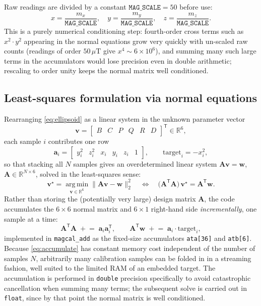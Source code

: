 \documentclass[11pt]{article}
\newcommand{\vect}[1]{\bm{#1}}
\newcommand{\mat}[1]{\bm{#1}}
\newcommand{\R}{\mathbb{R}}
\newcommand{\transpose}{^{\mathsf{T}}}
\begin{document}
Raw readings are divided by a constant $\texttt{MAG\_SCALE}=50$ before use:
\begin{equation}
x = \frac{m_x}{\texttt{MAG\_SCALE}}, \quad y = \frac{m_y}{\texttt{MAG\_SCALE}}, \quad z = \frac{m_z}{\texttt{MAG\_SCALE}}.
\end{equation}
This is a purely numerical conditioning step: fourth-order cross terms such as $x^2\!\cdot\! y^2$ appearing in the normal equations grow very quickly with un-scaled raw counts (readings of order $50\,\mu\mathrm{T}$ give $x^4 \sim 6\times10^6$), and summing many such large terms in the accumulators would lose precision even in double arithmetic; rescaling to order unity keeps the normal matrix well conditioned.

\subsection{Least-squares formulation via normal equations}

Rearranging \eqref{eq:ellipsoid} as a linear system in the unknown parameter vector
\begin{equation}
\vect v = \begin{bmatrix}B & C & P & Q & R & D\end{bmatrix}\transpose \in \R^6,
\end{equation}
each sample $i$ contributes one row
\begin{equation}
\vect a_i = \begin{bmatrix} y_i^2 & z_i^2 & x_i & y_i & z_i & 1 \end{bmatrix}, \qquad
\text{target}_i = -x_i^2,
\end{equation}
so that stacking all $N$ samples gives an overdetermined linear system $\mat A \vect v = \vect w$, $\mat A \in \R^{N\times 6}$, solved in the least-squares sense:
\begin{equation}
\vect v^{\star} = \operatorname*{arg\,min}_{\vect v \in \R^6} \lVert \mat A \vect v - \vect w \rVert_2^2
\quad\Longleftrightarrow\quad
\big(\mat A\transpose \mat A\big)\, \vect v^{\star} = \mat A\transpose \vect w .
\label{eq:normaleq}
\end{equation}
Rather than storing the (potentially very large) design matrix $\mat A$, the code accumulates the $6\times6$ normal matrix and $6\times1$ right-hand side \emph{incrementally}, one sample at a time:
\begin{equation}
\mat A\transpose\mat A \;\mathrel{+}=\; \vect a_i \vect a_i\transpose, \qquad
\mat A\transpose \vect w \;\mathrel{+}=\; \vect a_i \cdot \text{target}_i,
\label{eq:accumulate}
\end{equation}
implemented in \texttt{magcal\_add} as the fixed-size accumulators \texttt{ata[36]} and \texttt{atb[6]}. Because \eqref{eq:accumulate} has constant memory cost independent of the number of samples $N$, arbitrarily many calibration samples can be folded in in a streaming fashion, well suited to the limited RAM of an embedded target. The accumulation is performed in \texttt{double} precision specifically to avoid catastrophic cancellation when summing many terms; the subsequent solve is carried out in \texttt{float}, since by that point the normal matrix is well conditioned.
\end{document}
